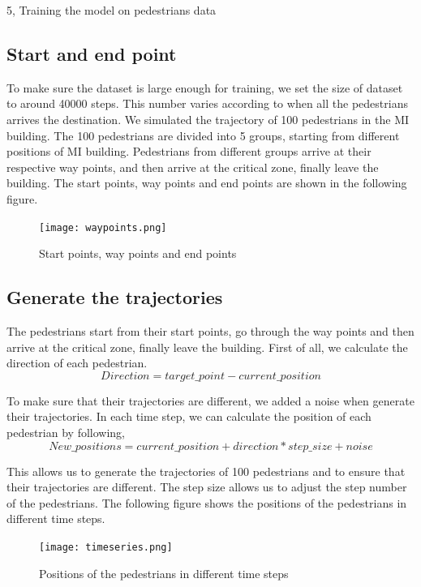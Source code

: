\documentclass[10pt,a4paper]{article}
\begin{document}
\begin{task}{5, Training the model on pedestrians data}
\subsection*{Start and end point}
To make sure the dataset is large enough for training, we set the size of dataset to around 40000 steps. This number varies according to when all the pedestrians arrives the destination. We simulated the trajectory of 100 pedestrians in the MI building. The 100 pedestrians are divided into 5 groups, starting from different positions of MI building. Pedestrians from different groups arrive at their respective way points, and then arrive at the critical zone, finally leave the building. The start points, way points and end points are shown in the following figure.
\begin{figure}[h!]
    \centering
    \texttt{[image: waypoints.png]}
    \caption{Start points, way points and end points}
    \label{fig:1}
\end{figure}

\subsection*{Generate the trajectories}
The pedestrians start from their start points, go through the way points and then arrive at the critical zone, finally leave the building. First of all, we calculate the direction of each pedestrian.
\begin{equation}
    Direction = target\_point - current\_position
\end{equation}

To make sure that their trajectories are different, we added a noise when generate their trajectories. In each time step, we can calculate the position of each pedestrian by following,
\begin{equation}
    New\_positions = current\_position + direction * step\_size + noise
\end{equation}

This allows us to generate the trajectories of 100 pedestrians and to ensure that their trajectories are different. The step size allows us to adjust the step number of the pedestrians. The following figure shows the positions of the pedestrians in different time steps.
\begin{figure}[h!]
    \centering
    \texttt{[image: timeseries.png]}
    \caption{Positions of the pedestrians in different time steps}
    \label{fig:2}
\end{figure}
\end{task}
\end{document}
